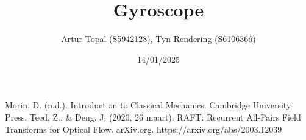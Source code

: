 \documentclass[a4paper, 9pt]{article}
\title{Gyroscope}
\author{Artur Topal (S5942128), Tyn Rendering (S6106366)}
\date{14/01/2025}
\begin{document}
\maketitle
\begin{abstract}
  \textit{}
\end{abstract}

\tableofcontents







\appendix



\begin{thebibliography}{99}
Morin, D. (n.d.). Introduction to Classical Mechanics. Cambridge University Press.
Teed, Z., \& Deng, J. (2020, 26 maart). RAFT: Recurrent All-Pairs Field Transforms for Optical Flow. arXiv.org. https://arxiv.org/abs/2003.12039
\end{thebibliography}
\end{document}
